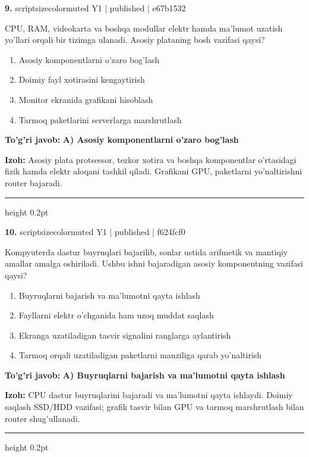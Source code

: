 \documentclass[10pt,a4paper]{article}
\begin{document}
{\bfseries\sffamily\color{ink} 9.} {scriptsizecolor{muted} Y1 | published | e67b1532}
\par
CPU, RAM, videokarta va boshqa modullar elektr hamda ma'lumot uzatish yo'llari orqali bir tizimga ulanadi. Asosiy plataning bosh vazifasi qaysi?
\begin{enumerate}[label=\Alph*),leftmargin=9mm]
\item Asosiy komponentlarni o'zaro bog'lash
\item Doimiy fayl xotirasini kengaytirish
\item Monitor ekranida grafikani hisoblash
\item Tarmoq paketlarini serverlarga marshrutlash
\end{enumerate}
\begin{tcolorbox}[enhanced,breakable,colback=teal!4,colframe=teal!60!black,boxrule=0.45pt,arc=1.2mm,left=2.7mm,right=2.7mm,top=1.8mm,bottom=1.8mm,before skip=2mm,after skip=2mm]
{\bfseries\sffamily\color{teal}To'g'ri javob:} \textbf{A) Asosiy komponentlarni o'zaro bog'lash}
\par\smallskip
{\bfseries Izoh:} Asosiy plata protsessor, tezkor xotira va boshqa komponentlar o'rtasidagi fizik hamda elektr aloqani tashkil qiladi. Grafikani GPU, paketlarni yo'naltirishni router bajaradi.
\end{tcolorbox}
\vspace{2mm}\hrule height 0.2pt\vspace{3mm}

{\bfseries\sffamily\color{ink} 10.} {scriptsizecolor{muted} Y1 | published | f624fcf0}
\par
Kompyuterda dastur buyruqlari bajarilib, sonlar ustida arifmetik va mantiqiy amallar amalga oshiriladi. Ushbu ishni bajaradigan asosiy komponentning vazifasi qaysi?
\begin{enumerate}[label=\Alph*),leftmargin=9mm]
\item Buyruqlarni bajarish va ma'lumotni qayta ishlash
\item Fayllarni elektr o'chganida ham uzoq muddat saqlash
\item Ekranga uzatiladigan tasvir signalini ranglarga aylantirish
\item Tarmoq orqali uzatiladigan paketlarni manziliga qarab yo'naltirish
\end{enumerate}
\begin{tcolorbox}[enhanced,breakable,colback=teal!4,colframe=teal!60!black,boxrule=0.45pt,arc=1.2mm,left=2.7mm,right=2.7mm,top=1.8mm,bottom=1.8mm,before skip=2mm,after skip=2mm]
{\bfseries\sffamily\color{teal}To'g'ri javob:} \textbf{A) Buyruqlarni bajarish va ma'lumotni qayta ishlash}
\par\smallskip
{\bfseries Izoh:} CPU dastur buyruqlarini bajaradi va ma'lumotni qayta ishlaydi. Doimiy saqlash SSD/HDD vazifasi; grafik tasvir bilan GPU va tarmoq marshrutlash bilan router shug'ullanadi.
\end{tcolorbox}
\vspace{2mm}\hrule height 0.2pt\vspace{3mm}
\end{document}

